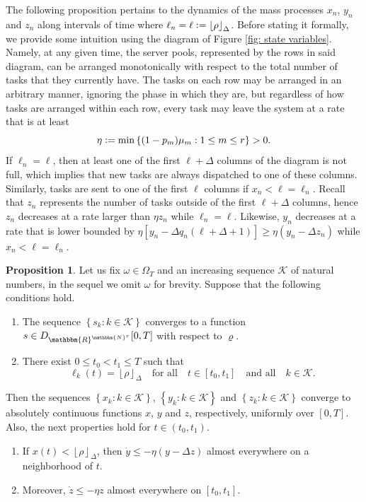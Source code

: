 \documentclass[a4paper, 12pt]{article}
\theoremstyle{definition}
\newtheorem{proposition}[theorem]{Proposition}
\newcommand{\floor}[1]{\left\lfloor#1\right\rfloor}
\newcommand{\set}[2]{\left\{#1 : #2\right\}}
\newcommand{\defeq}{\vcentcolon=}
\newcommand{\calK}{\mathcal{K}}
\newcommand{\N}{\mathbbm{N}}
\newcommand{\R}{\mathbbm{R}}
\begin{document}
The following proposition pertains to the dynamics of the mass processes $x_n$, $y_n$ and $z_n$ along intervals of time where $\ell_n = \ell \defeq \floor{\rho}_\Delta$. Before stating it formally, we provide some intuition using the diagram of Figure \ref{fig: state variables}. Namely, at any given time, the server pools, represented by the rows in said diagram, can be arranged monotonically with respect to the total number of tasks that they currently have. The tasks on each row may be arranged in an arbitrary manner, ignoring the phase in which they are, but regardless of how tasks are arranged within each row, every task may leave the system at a rate that is at least
\begin{equation*}
	\eta \defeq \min \set{(1 - p_m)\mu_m}{1 \leq m \leq r} > 0.
\end{equation*}
If $\ell_n = \ell$, then at least one of the first $\ell + \Delta$ columns of the diagram is not full, which implies that new tasks are always dispatched to one of these columns. Similarly, tasks are sent to one of the first $\ell$ columns if $x_n < \ell = \ell_n$. Recall that $z_n$ represents the number of tasks outside of the first $\ell + \Delta$ columns, hence $z_n$ decreases at a rate larger than $\eta z_n$ while $\ell_n = \ell$. Likewise, $y_n$ decreases at a rate that is lower bounded by $\eta \left[y_n - \Delta q_n(\ell + \Delta + 1)\right] \geq \eta \left(y_n - \Delta z_n\right)$ while $x_n < \ell = \ell_n$.

\begin{proposition}
	\label{prop: mass processes coxian case}
	Let us fix $\omega \in \Omega_T$ and an increasing sequence $\calK$ of natural numbers, in the sequel we omit $\omega$ for brevity. Suppose that the following conditions hold.
	\begin{enumerate}
		\item[(a)] The sequence $\set{s_k}{k \in \calK}$ converges to a function $s \in D_{\R^{\N^r}}[0, T]$ with respect to $\varrho$.
		
		\item[(b)] There exist $0 \leq t_0 < t_1 \leq T$ such that
		\begin{equation*}
			\ell_k(t) = \floor{\rho}_\Delta \quad \text{for all} \quad t \in [t_0, t_1] \quad \text{and all} \quad k \in \calK.
		\end{equation*}
	\end{enumerate}
	Then the sequences $\set{x_k}{k \in \calK}$, $\set{y_k}{k \in \calK}$ and $\set{z_k}{k \in \calK}$ converge to absolutely continuous functions $x$, $y$ and $z$, respectively, uniformly over $[0, T]$. Also, the next properties hold for $t \in (t_0, t_1)$.
	\begin{enumerate}
		\item[(i)] If $x(t) < \floor{\rho}_\Delta$, then $\dot{y} \leq -\eta (y - \Delta z)$ almost everywhere on a neighborhood of $t$.
		
		\item[(ii)] Moreover, $\dot{z} \leq -\eta z$ almost everywhere on $[t_0, t_1]$.
	\end{enumerate}
\end{proposition}
\end{document}
